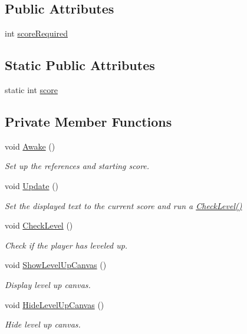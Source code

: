 \subsection*{Public Attributes}
\begin{DoxyCompactItemize}
\item 
int \mbox{\hyperlink{class_score_manager_a9bb2bec9e7587f8059bec5404749eda1}{score\+Required}}
\end{DoxyCompactItemize}
\subsection*{Static Public Attributes}
\begin{DoxyCompactItemize}
\item 
static int \mbox{\hyperlink{class_score_manager_ab0036417bd3468315aec1def60f46221}{score}}
\end{DoxyCompactItemize}
\subsection*{Private Member Functions}
\begin{DoxyCompactItemize}
\item 
void \mbox{\hyperlink{class_score_manager_a68b661eece0b6102ad825d88990a83f8}{Awake}} ()
\begin{DoxyCompactList}\small\item\em Set up the references and starting score. \end{DoxyCompactList}\item 
void \mbox{\hyperlink{class_score_manager_a0d37ca647468e53d1735d8d185b7ee34}{Update}} ()
\begin{DoxyCompactList}\small\item\em Set the displayed text to the current score and run a \mbox{\hyperlink{class_score_manager_ac524ca46a457f5258a2632e979640021}{Check\+Level()}} \end{DoxyCompactList}\item 
void \mbox{\hyperlink{class_score_manager_ac524ca46a457f5258a2632e979640021}{Check\+Level}} ()
\begin{DoxyCompactList}\small\item\em Check if the player has leveled up. \end{DoxyCompactList}\item 
void \mbox{\hyperlink{class_score_manager_ac076b18c0e58bcbb0b4909a26e6a96e1}{Show\+Level\+Up\+Canvas}} ()
\begin{DoxyCompactList}\small\item\em Display level up canvas. \end{DoxyCompactList}\item 
void \mbox{\hyperlink{class_score_manager_a8a31ef6ffd768ccb2305f81a4830a875}{Hide\+Level\+Up\+Canvas}} ()
\begin{DoxyCompactList}\small\item\em Hide level up canvas. \end{DoxyCompactList}\end{DoxyCompactItemize}
